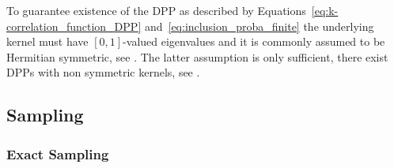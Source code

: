 \documentclass[twoside,11pt]{article}
\begin{document}
    To guarantee existence of the DPP as described by Equations~\ref{eq:k-correlation_function_DPP} and~\ref{eq:inclusion_proba_finite} the underlying kernel must have $[0,1]$-valued eigenvalues and it is commonly assumed to be Hermitian symmetric, see \citep[Theorem 3]{Sos00}.
    The latter assumption is only sufficient, there exist DPPs with non symmetric kernels, see \citep{BoDiFu09}.

  \subsection{Sampling} %
  \label{sub:sampling}

    \subsubsection{Exact Sampling} %
    \label{ssub:exact_sampling}
\end{document}
